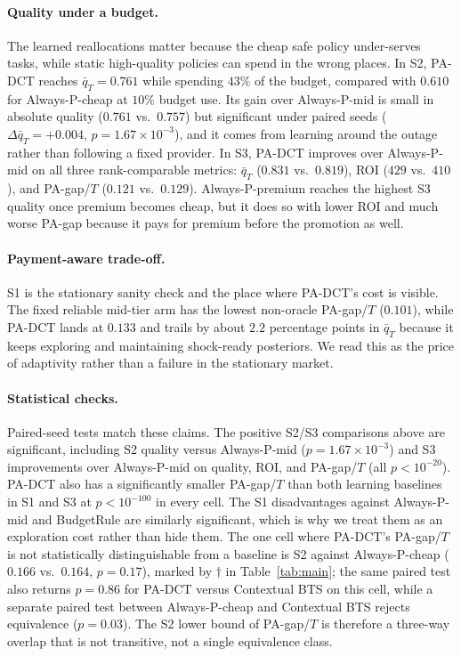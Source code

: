 \paragraph{Quality under a budget.}
The learned reallocations matter because the cheap safe policy under-serves tasks, while static high-quality policies can spend in the wrong places. In S2, PA-DCT reaches $\bar q_T=0.761$ while spending $43\%$ of the budget, compared with $0.610$ for Always-P-cheap at $10\%$ budget use. Its gain over Always-P-mid is small in absolute quality ($0.761$ vs.\ $0.757$) but significant under paired seeds ($\Delta\bar q_T=+0.004$, $p=1.67\times10^{-3}$), and it comes from learning around the outage rather than following a fixed provider. In S3, PA-DCT improves over Always-P-mid on all three rank-comparable metrics: $\bar q_T$ ($0.831$ vs.\ $0.819$), ROI ($429$ vs.\ $410$), and PA-gap/$T$ ($0.121$ vs.\ $0.129$). Always-P-premium reaches the highest S3 quality once premium becomes cheap, but it does so with lower ROI and much worse PA-gap because it pays for premium before the promotion as well.

\paragraph{Payment-aware trade-off.}
S1 is the stationary sanity check and the place where PA-DCT's cost is visible. The fixed reliable mid-tier arm has the lowest non-oracle PA-gap/$T$ ($0.101$), while PA-DCT lands at $0.133$ and trails by about $2.2$ percentage points in $\bar q_T$ because it keeps exploring and maintaining shock-ready posteriors. We read this as the price of adaptivity rather than a failure in the stationary market.

\paragraph{Statistical checks.}
Paired-seed tests match these claims. The positive S2/S3 comparisons above are significant, including S2 quality versus Always-P-mid ($p=1.67\times10^{-3}$) and S3 improvements over Always-P-mid on quality, ROI, and PA-gap/$T$ (all $p<10^{-20}$). PA-DCT also has a significantly smaller PA-gap/$T$ than both learning baselines in S1 and S3 at $p<10^{-100}$ in every cell. The S1 disadvantages against Always-P-mid and BudgetRule are similarly significant, which is why we treat them as an exploration cost rather than hide them. The one cell where PA-DCT's PA-gap/$T$ is not statistically distinguishable from a baseline is S2 against Always-P-cheap ($0.166$ vs.\ $0.164$, $p=0.17$), marked by $\dagger$ in Table~\ref{tab:main}; the same paired test also returns $p=0.86$ for PA-DCT versus Contextual BTS on this cell, while a separate paired test between Always-P-cheap and Contextual BTS rejects equivalence ($p=0.03$). The S2 lower bound of PA-gap/$T$ is therefore a three-way overlap that is not transitive, not a single equivalence class.

